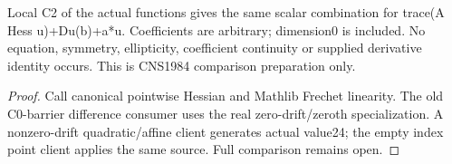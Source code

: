 \begin{lemma}
  \label{lem:elliptic-operator-linearity}
  \leanok
  Local C2 of the actual functions gives the same scalar combination for
  trace(A Hess u)+Du(b)+a*u. Coefficients are arbitrary; dimension0 is included.
  No equation, symmetry, ellipticity, coefficient continuity or supplied
  derivative identity occurs. This is CNS1984 comparison preparation only.
\end{lemma}
\begin{proof}
  \leanok
  Call canonical pointwise Hessian and Mathlib Frechet linearity. The old
  C0-barrier difference consumer uses the real zero-drift/zeroth specialization.
  A nonzero-drift quadratic/affine client generates actual value24; the empty
  index point client applies the same source. Full comparison remains open.
\end{proof}
